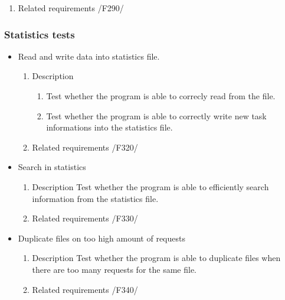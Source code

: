 {\begin{itemize}
\begin{enumerate}
					\item Related requirements\newline
					/F290/
				\end{enumerate}
		\end{itemize}
		\subsubsection{Statistics tests}
		\begin{itemize}
		
		
		
				\item Read and write data into statistics file.
				\begin{enumerate}
					\item Description\newline
					\begin{enumerate}
					
					\item 
Test whether the program is able to correcly read from the file.
					\item
Test whether the program is able to correctly write new task informations into the statistics file.
					\end{enumerate}
					\item Related requirements\newline
					/F320/
					
				\end{enumerate}
				
				
				\item Search in statistics
				\begin{enumerate}
					\item Description\newline
Test whether the program is able to efficiently search information from the statistics file. 
					\item Related requirements\newline
					/F330/
				\end{enumerate}
				
				
				\item Duplicate files on too high amount of requests
				\begin{enumerate}
					\item Description\newline
Test whether the program is able to duplicate files when there are too many requests for the same file.
					\item Related requirements\newline
					/F340/
				\end{enumerate}
				

\end{itemize}}
